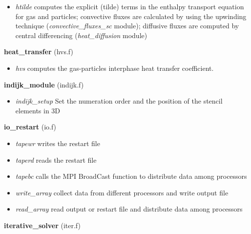 \begin{itemize}
\item{\em htilde} computes the explicit (tilde) terms in the enthalpy transport equation for gas and particles; 
convective fluxes are calculated by using the upwinding technique ({\em convective\_fluxes\_sc} module); 
diffusive fluxes are computed by central differencing ({\em heat\_diffusion} module)\\
\end{itemize}
%
%
{\large{\bf heat\_transfer}} (hvs.f) \\
\begin{itemize}
\item{\em hvs} computes the gas-particles interphase heat transfer coefficient.
\end{itemize}
%
%
{\large{\bf indijk\_module}} (indijk.f) \\
\begin{itemize}
\item{\em indijk\_setup} Set the numeration order and the position of the stencil elements in 3D
\end{itemize}
%
%
%
%
{\large{\bf io\_restart}} (io.f)\\
\begin{itemize}
\item{\em tapewr} writes the restart file
\item{\em taperd} reads the restart file
\item{\em tapebc} calls the MPI BroadCast function to distribute data among processors
\item{\em write\_array} collect data from different processors and write output file
\item{\em read\_array}  read output or restart file and  distribute data among processors
\end{itemize}
%
%
{\large{\bf iterative\_solver}} (iter.f)\\[5mm]
